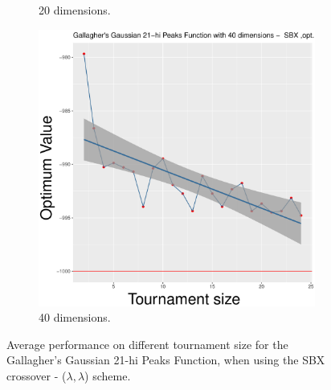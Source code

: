 \begin{figure}[t]
\begin{subfigure}[b]{0.33\textwidth}
		\caption{20 dimensions.}
	\end{subfigure}
	\begin{subfigure}[b]{0.33\textwidth}
		\centering
		\includegraphics[width=\textwidth]{img/SBX-40D/multimodal_sbx_22_dim_40.pdf}
		\caption{40 dimensions.}
	\end{subfigure}
	\caption{Average performance on different tournament size for the Gallagher's Gaussian 21-hi Peaks Function, when using the SBX crossover - ($\lambda, \lambda$) scheme.}
	\label{sbx-22}
\end{figure}


